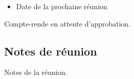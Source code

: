 \documentclass[a4paper,11pt,french]{quarto-lettre}
\newenvironment{div-body}{%
}{\vspace{0.5em}}
\newenvironment{div-next-meeting}{%
  \section*{Prochaine réunion}
}{\vspace{0.5em}}
\newenvironment{div-approval}{%
  \section*{Approbation du compte-rendu}
  \begin{flushright}
    \begin{minipage}{10cm}
}{%
    \end{minipage}
  \end{flushright}
}
\begin{document}
\begin{div-next-meeting}

\begin{itemize}
\tightlist
\item
  Date de la prochaine réunion
\end{itemize}

\end{div-next-meeting}

\begin{div-approval}

Compte-rende en attente d'approbation.

\end{div-approval}

\begin{div-body}

\section{Notes de réunion}\label{notes-de-ruxe9union}

Notes de la réunion.

\end{div-body}
\end{document}
